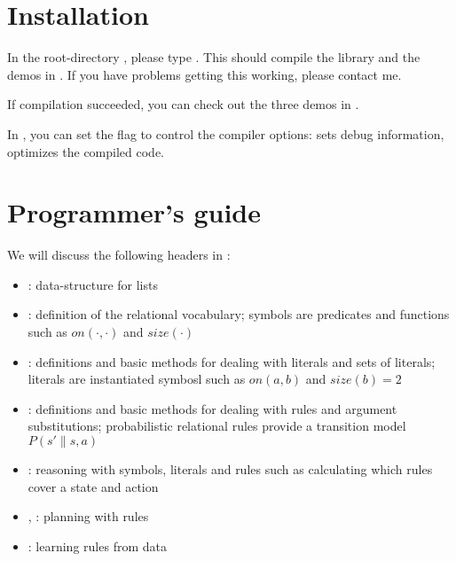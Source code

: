 \documentclass[10pt,twoside,twocolumn,fleqn]{article}
\begin{document}

\section{Installation}

In the root-directory , please type . This
should compile the library  and the demos in
. If you have problems getting this working, please contact me.

If compilation succeeded, you can check out the three demos in
.

In , you can set the flag  to control the
compiler options:  sets debug information,  optimizes the compiled code.




\section{Programmer's guide}

We will discuss the following headers in :
\begin{itemize}
\item {}: data-structure for lists
\item {}: definition of the relational
vocabulary; symbols are predicates and functions such as $on(\cdot,\cdot)$
and $size(\cdot)$
\item {}: definitions and basic methods
for dealing with literals and sets of literals; literals are instantiated
symbosl such as $on(a,b)$ and $size(b)=2$
\item {}: definitions and basic methods for dealing
with rules and argument substitutions; probabilistic relational rules
provide a transition model $P(s' \| s,a)$
\item {}: reasoning with symbols, literals and
rules such as calculating which rules cover a state and action
\item {}, : planning with
rules
\item {}: learning rules from data
\end{itemize}
\end{document}
